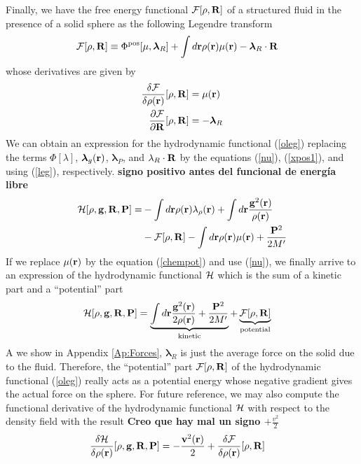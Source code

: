\documentclass[b5paper,openright,10pt]{book}
\newcommand{\Note}[1]{{\bf \color{red}#1}}    %
\begin{document}
Finally, we have the free energy functional ${\cal  F}[\rho,{\bf R}]$ of a structured fluid in the presence of a solid sphere as the following Legendre transform
\begin{align}
  {\cal F}[\rho,{\bf R}]&\equiv  \Phi^{\rm pos}[\mu,\boldsymbol{\lambda}_R]
+
\int d{\bf r}\rho({\bf r})\mu({\bf r})-\boldsymbol{\lambda}_R\cdot{\bf R}
\label{leg}
\end{align}
whose derivatives are given by 
\begin{align}
   \frac{\delta {\cal F}}{\delta\rho({\bf r})}[\rho,{\bf R}] &=\mu({\bf r})
\nonumber\\
   \frac{\partial {\cal F}}{\partial{\bf R}}[\rho,{\bf R}] &=-\boldsymbol{\lambda}_R
\label{Fd2}
\end{align}
We can obtain an expression for the  hydrodynamic functional (\ref{oleg}) replacing the terms $\Phi[\lambda]$, $\boldsymbol{\lambda}_g({\bf r})$, $\boldsymbol{\lambda}_P$, and $\lambda_R\cdot{\bf R}$ by the equations (\ref{nu}), (\ref{xpos1}), and using (\ref{leg}), respectively.
\Note{signo positivo antes del funcional de energía  libre}
\begin{align}
  {\cal H}[\rho,{\bf g},{\bf R},{\bf P}] =& 
  -\int d{\bf r} \rho({\bf r})\lambda_{\rho}({\bf r}) 
  +\int d{\bf r}\frac{{\bf g}^2({\bf r})}{\rho({\bf r})} 
  \nonumber\\
  &- {\cal F}[\rho,{\bf R}] -\int d{\bf r}\rho({\bf r})\mu({\bf r}) + \frac{{\bf P}^2}{2M'}
\end{align}
If we replace $\mu({\bf r})$ by the equation (\ref{chempot}) and use (\ref{nu}), we finally arrive to an expression of the hydrodynamic functional ${\cal H}$ which is the sum of a kinetic part and a ``potential'' part
\begin{align}
  {\cal H}[\rho,{\bf g},{\bf R},{\bf P}] &=   
  \underbrace{\int d{\bf r}\frac{{\bf g}^2({\bf r})}{2\rho({\bf r})} +\frac{{\bf P}^2}{2M'}}_{\rm kinetic}
  +\underbrace{{\cal F}[\rho,{\bf R}]}_{\rm potential}
\label{oleg2}
\end{align}
A we show in Appendix \ref{Ap:Forces}, $\boldsymbol{\lambda}_R$
is just the  average force on the solid due  to the fluid.  Therefore,
the ``potential''  part ${\cal  F}[\rho,{\bf R}]$ of  the hydrodynamic
functional  (\ref{oleg})  really  acts  as a  potential  energy  whose
negative gradient  gives the actual  force on the sphere.   For future
reference,  we  may also  compute  the  functional derivative  of  the
hydrodynamic functional ${\cal  H}$ with respect to  the density field
with the result
\Note{Creo que hay mal un signo $+\frac{v^2}{2}$}
\begin{align}
  \frac{\delta {\cal H}}{\delta\rho({\bf r})}[\rho,{\bf g},{\bf R},{\bf P}] &=    
-\frac{{\bf v}^2({\bf r})}{2}+  \frac{\delta {\cal F}}{\delta\rho({\bf r})}[\rho,{\bf R}]
\end{align}
\end{document}
